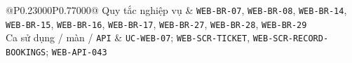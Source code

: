 \begin{longtable}{@{}P{0.23000\SRSWidth}P{0.77000\SRSWidth}@{}}
Quy tắc nghiệp vụ & \texttt{WEB-\allowbreak{}BR-\allowbreak{}07}, \texttt{WEB-\allowbreak{}BR-\allowbreak{}08}, \texttt{WEB-\allowbreak{}BR-\allowbreak{}14}, \texttt{WEB-\allowbreak{}BR-\allowbreak{}15}, \texttt{WEB-\allowbreak{}BR-\allowbreak{}16}, \texttt{WEB-\allowbreak{}BR-\allowbreak{}17}, \texttt{WEB-\allowbreak{}BR-\allowbreak{}27}, \texttt{WEB-\allowbreak{}BR-\allowbreak{}28}, \texttt{WEB-\allowbreak{}BR-\allowbreak{}29} \\[3pt]
Ca sử dụng /\allowbreak{} màn /\allowbreak{} \texttt{API} & \texttt{UC-\allowbreak{}WEB-\allowbreak{}07}; \texttt{WEB-\allowbreak{}SCR-\allowbreak{}TICKET}, \texttt{WEB-\allowbreak{}SCR-\allowbreak{}RECORD-\allowbreak{}BOOKINGS\allowbreak{}}; \texttt{WEB-\allowbreak{}API-\allowbreak{}043} \\[3pt]
\end{longtable}
\endgroup

